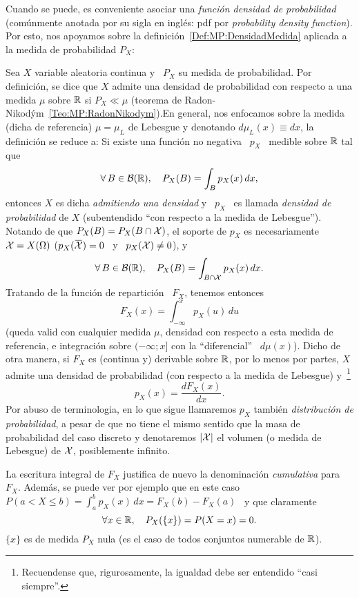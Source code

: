Cuando  se  puede,  es  conveniente  asociar  una  {\it  funci\'on  densidad  de
  probabilidad} (com\'unmente  anotada por  su sigla en  ingl\'es: pdf  por {\it
  probability   density   function}).   Por   esto,   nos   apoyamos   sobre   la
definici\'on~\ref{Def:MP:DensidadMedida}  aplicada a  la medida  de probabilidad
$P_X$:
%
\begin{definicion}
\label{Def:MP:VariableAdmitiendoDensidad}
%
  Sea $X$ variable  aleatoria continua y \ $P_X$ su  medida de probabilidad. Por
  definici\'on, se dice que $X$ admite una densidad de probabilidad con respecto
  a   una  medida   $\mu$  sobre   $\mathbb{R}$  si   $P_X  \ll   \mu$   (teorema  de
  Radon-Nikod\'ym~\ref{Teo:MP:RadonNikodym}).\newline En  general, nos enfocamos
  sobre la  medida (dicha de referencia)  $\mu = \mu_L$ de  Lebesgue y denotando
  $d\mu_L(x) \equiv dx$, la definici\'on se reduce a: Si existe una funci\'on no
  negativa \ $p_X$ \ medible sobre $\mathbb{R}$ tal que
  \[
  \forall \, B \in \mathcal{B}(\mathbb{R}), \quad P_X(B) = \int_B p_X(x) \, dx,
  \]
  entonces $X$  es dicha {\it  admitiendo una densidad}  y \ $p_X$ \  es llamada
  {\it densidad de probabilidad} de  $X$ (subentendido ``con respecto a la medida
  de Lebesgue'').  Notando de que $P_X(B) = P_X(B \cap \mathcal{X})$, el soporte de $p_X$
  es necesariamente $\mathcal{X} = X(\Omega)$ (\ie $p_X(\widebar{\X}) = 0$ \ y \ $p_X(\mathcal{X})
  \ne 0$), y
  \[
  \forall \, B \in \mathcal{B}(\mathbb{R}), \quad P_X(B) = \int_{B \cap \mathcal{X}} p_X(x) \, dx.
  \]
  Tratando de la funci\'on de repartici\'on \ $F_X$, tenemos entonces
  \[
  F_X(x) = \int_{-\infty}^x p_X(u) \, du
  \]
  (queda valid con cualquier medida $\mu$, densidad con respecto a esta medida de
  referencia,  e integraci\'on  sobre $(-\infty;  x]$ con  la  ``diferencial'' \
  $d\mu(x)$).  Dicho  de otra manera, si  $F_X$ es (continua  y) derivable sobre
  $\mathbb{R}$, por lo menos por partes, $X$ admite una densidad de probabilidad (con
  respecto a  la medida de Lebesgue)  y~\footnote{Recuendense que, rigurosamente,
    la igualdad debe ser entendido ``casi siempre''.}
  \[
  p_X(x) = \frac{d F_X(x)}{dx}.
  \]
  Por abuso  de terminologia,  en lo que  sigue llamaremos $p_X$  tambi\'en {\it
    distribuci\'on de  probabilidad}, a pesar de  que no tiene  el mismo sentido
  que la masa de probabilidad del  caso discreto y denotaremos $|\mathcal{X}|$ el volumen
  (o medida de Lebesgue) de $\mathcal{X}$, posiblemente infinito.
\end{definicion}
%
La  escritura  integral de  $F_X$  justifica  de  nuevo la  denominaci\'on  {\it
  cumulativa} para  $F_X$. Adem\'as, se puede  ver por ejemplo que  en este caso
$\displaystyle P(a < X \le b) = \int_a^b p_X(x) \, dx = F_X(b) - F_X(a)$ \ y que
claramente
%
\[
\forall x \in \mathbb{R}, \quad P_X(\{x\}) = P(X = x) = 0.
\]
%
$\{ x \}$  es de medida $P_X$ nula  (es el caso de todos  conjuntos numerable de
$\mathbb{R}$).

